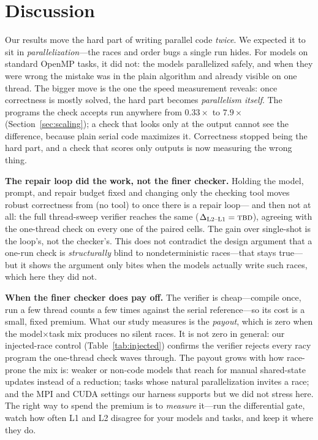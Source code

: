 \section{Discussion}
\label{sec:discussion}

Our results move the hard part of writing parallel code \emph{twice}. We expected it to sit
in \emph{parallelization}---the races and order bugs a single run hides. For \Nmodels{}
models on standard OpenMP tasks, it did not: the models parallelized safely, and when they
were wrong the mistake was in the plain algorithm and already visible on one thread. The
bigger move is the one the speed measurement reveals: once correctness is mostly solved, the
hard part becomes \emph{parallelism itself}. The programs the check accepts run anywhere from
$0.33\times$ to $7.9\times$ (Section~\ref{sec:scaling}); a check that looks only at the output
cannot see the difference, because plain serial code maximizes it. Correctness stopped being
the hard part, and a check that scores only outputs is now measuring the wrong thing.

\vspace{3pt}
\noindent\textbf{The repair loop did the work, not the finer checker.}
Holding the model, prompt, and repair budget fixed and changing only the checking tool moves
robust correctness from \Lzerorate{} (no tool) to \Lonerate{} once there is a repair loop---
and then not at all: the full thread-sweep verifier reaches the same \Ltworate{}
($\Delta_{\text{L2--L1}}=\textsc{tbd}{}$), agreeing with the one-thread check on every one of
the \Npairs{} paired cells. The gain over single-shot is the loop's, not the checker's. This
does not contradict the design argument that a one-run check is \emph{structurally} blind to
nondeterministic races---that stays true---but it shows the argument only bites when the
models actually write such races, which here they did not.

\vspace{3pt}
\noindent\textbf{When the finer checker does pay off.}
The verifier is cheap---compile once, run a few thread counts a few times against the serial
reference---so its cost is a small, fixed premium. What our study measures is the
\emph{payout}, which is zero when the model$\times$task mix produces no silent races. It is
not zero in general: our injected-race control (Table~\ref{tab:injected}) confirms the
verifier rejects every racy program the one-thread check waves through. The payout grows with
how race-prone the mix is: weaker or non-code models that reach for manual shared-state updates
instead of a reduction; tasks whose natural parallelization invites a race; and the MPI and
CUDA settings our harness supports but we did not stress here. The right way to spend the
premium is to \emph{measure} it---run the differential gate, watch how often L1 and L2
disagree for your models and tasks, and keep it where they do.

